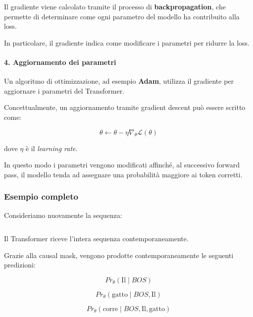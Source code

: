 Il gradiente viene calcolato tramite il processo di
\textbf{backpropagation}, che permette di determinare come ogni
parametro del modello ha contribuito alla loss.

In particolare, il gradiente indica come modificare i parametri per
ridurre la loss.

\paragraph{4. Aggiornamento dei parametri}

Un algoritmo di ottimizzazione, ad esempio \textbf{Adam}, utilizza il
gradiente per aggiornare i parametri del Transformer.

Concettualmente, un aggiornamento tramite gradient descent può essere
scritto come:

\begin{equation}
\boxed{
\theta
\leftarrow
\theta - \eta \nabla_\theta \mathcal{L}(\theta)
}
\end{equation}

dove $\eta$ è il \textit{learning rate}.

In questo modo i parametri vengono modificati affinché, al successivo
forward pass, il modello tenda ad assegnare una probabilità maggiore
ai token corretti.

\subsubsection{Esempio completo}

Consideriamo nuovamente la sequenza:

\begin{equation}
[BOS,\ \text{Il},\ \text{gatto},\ \text{corre}]
\end{equation}

Il Transformer riceve l'intera sequenza contemporaneamente.

Grazie alla causal mask, vengono prodotte contemporaneamente le
seguenti predizioni:

\begin{equation}
Pr_\theta(\text{Il}\mid BOS)
\end{equation}

\begin{equation}
Pr_\theta(\text{gatto}\mid BOS,\text{Il})
\end{equation}

\begin{equation}
Pr_\theta(\text{corre}\mid BOS,\text{Il},\text{gatto})
\end{equation}

